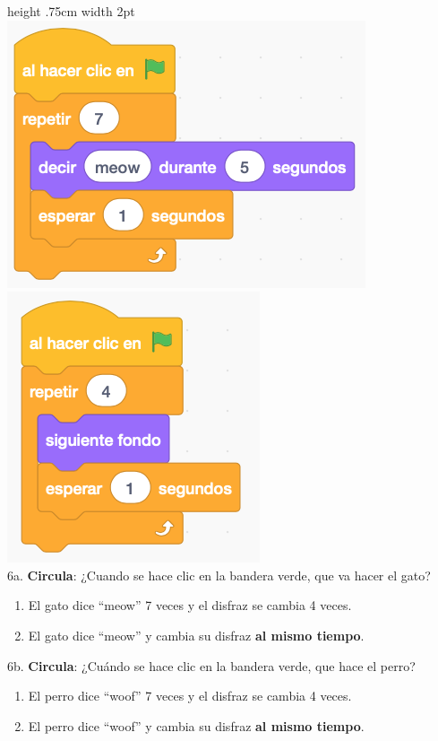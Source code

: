 \documentclass[letterpaper,12pt]{article}
\begin{document}
 \vline height .75cm width 2pt \hspace{1cm}
\includegraphics[scale=.8, valign=t]{q6_script1.png} \hspace{1cm}
\includegraphics[scale=.8, valign=t]{q6_script2.png} \\ 

\noindent 6a. \textbf{Circula}: ¿Cuando se hace clic en la bandera verde, que va hacer el gato?
\renewcommand{\theenumi}{\Alph{enumi}}
\begin{enumerate}
\item El gato dice “meow” 7 veces y el disfraz se cambia 4 veces. 
\item El gato dice “meow” y cambia su disfraz \textbf{al mismo tiempo}. \\
\end{enumerate}

\noindent 6b. \textbf{Circula}: ¿Cuándo se hace clic en la bandera verde, que hace el perro?
\renewcommand{\theenumi}{\Alph{enumi}}
\begin{enumerate}
\item El perro dice “woof” 7 veces y el disfraz se cambia 4 veces.
\item El perro dice “woof” y cambia su disfraz \textbf{al mismo tiempo}.
\end{enumerate}
\end{document}
